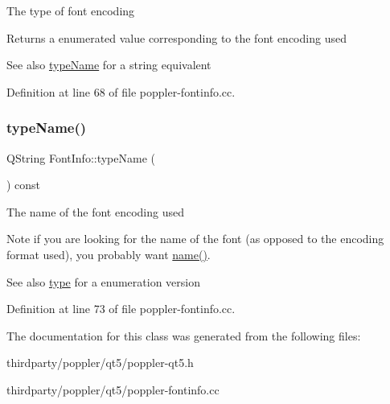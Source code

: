 The type of font encoding

\begin{DoxyReturn}{Returns}
a enumerated value corresponding to the font encoding used
\end{DoxyReturn}
\begin{DoxySeeAlso}{See also}
\hyperlink{class_poppler_1_1_font_info_afe24dd8e3a04e0cc6be1d97f7c4d354f}{type\+Name} for a string equivalent 
\end{DoxySeeAlso}


Definition at line 68 of file poppler-\/fontinfo.\+cc.

\mbox{\label{class_poppler_1_1_font_info_afe24dd8e3a04e0cc6be1d97f7c4d354f}} 
\subsubsection{\texorpdfstring{type\+Name()}{typeName()}}
{\footnotesize\ttfamily Q\+String Font\+Info\+::type\+Name (\begin{DoxyParamCaption}{ }\end{DoxyParamCaption}) const}

The name of the font encoding used

\begin{DoxyNote}{Note}
if you are looking for the name of the font (as opposed to the encoding format used), you probably want \hyperlink{class_poppler_1_1_font_info_aee13f37dc29e952ebb712edc28247e27}{name()}.
\end{DoxyNote}
\begin{DoxySeeAlso}{See also}
\hyperlink{class_poppler_1_1_font_info_aca229fe40069fabdf4b9d3bc58e50c32}{type} for a enumeration version 
\end{DoxySeeAlso}


Definition at line 73 of file poppler-\/fontinfo.\+cc.



The documentation for this class was generated from the following files\+:\begin{DoxyCompactItemize}
\item 
thirdparty/poppler/qt5/poppler-\/qt5.\+h\item 
thirdparty/poppler/qt5/poppler-\/fontinfo.\+cc\end{DoxyCompactItemize}
